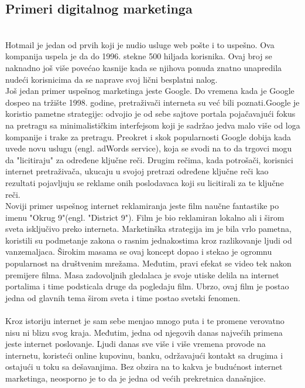 \documentclass[a4paper]{article}
\begin{document}
{\subsection{Primeri digitalnog marketinga }
\label{subsec:primeri}
\\ Hotmail je jedan od prvih koji je nudio usluge web pošte i to uspešno. Ova kompanija uspela je da do 1996. stekne 500 hiljada korisnika. Ovaj broj se naknadno još više povećao kasnije kada se njihova ponuda znatno unapredila nudeći korisnicima da se naprave svoj lični besplatni nalog.
\\Još jedan primer uspešnog marketinga jeste Google. Do vremena kada je Google dospeo na tržište 1998. godine, pretraživači interneta su već bili poznati.Google je koristio pametne strategije: odvojio je od sebe sajtove portala pojačavajući fokus na pretragu sa minimalističkim interfejsom koji je sadržao jedva malo više od loga kompanije i trake za pretragu. Preokret i skok popularnosti Google dobija kada uvede novu uslugu (engl. adWords service), koja se svodi na to da trgovci mogu da "licitiraju" za određene ključne reči. Drugim rečima, kada potrošači, korisnici internet pretraživača, ukucaju u svojoj pretrazi određene ključne reči kao rezultati pojavljuju se reklame onih poslodavaca koji su licitirali za te ključne reči.
\\Noviji primer uspešnog internet reklamiranja jeste film naučne fantastike po imenu "Okrug 9"(engl. "District 9"). Film je bio reklamiran lokalno ali i širom sveta isključivo preko interneta. Marketinška strategija im je bila vrlo pametna, koristili su podmetanje zakona o rasnim jednakostima kroz razlikovanje ljudi od vanzemaljaca. Širokim masama se ovaj koncept dopao i stekao je ogromnu popularnost na društvenim mrežama. Međutim, pravi efekat se video tek nakon premijere filma. Masa zadovoljnih gledalaca je svoje utiske delila na internet portalima i time podsticala druge da pogledaju film. Ubrzo, ovaj film je postao jedna od glavnih tema širom sveta i time postao svetski fenomen.
\\\\
Kroz istoriju internet je sam sebe menjao mnogo puta i te promene verovatno nisu ni blizu svog kraja. Međutim, jedna od njegovih danas najvećih primena jeste internet poslovanje. Ljudi danas sve više i više vremena provode na internetu, koristeći online kupovinu, banku, održavajući kontakt sa drugima i ostajući u toku sa dešavanjima. Bez obzira na to kakva je budućnost internet marketinga, neosporno je to da je jedna od većih prekretnica današnjice.\cite{istorija}

}
\end{document}
